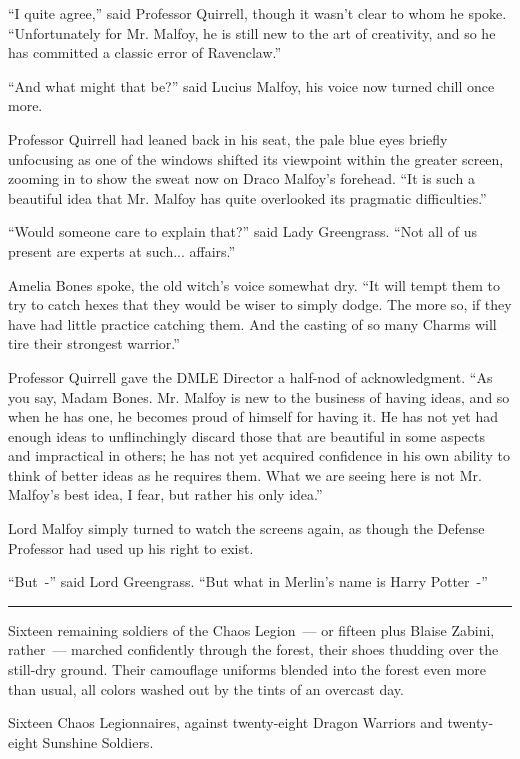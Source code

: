 ``I quite agree,'' said Professor Quirrell, though it wasn't clear to whom he spoke. ``Unfortunately for Mr. Malfoy, he is still new to the art of creativity, and so he has committed a classic error of Ravenclaw.''

``And what might that be?'' said Lucius Malfoy, his voice now turned chill once more.

Professor Quirrell had leaned back in his seat, the pale blue eyes briefly unfocusing as one of the windows shifted its viewpoint within the greater screen, zooming in to show the sweat now on Draco Malfoy's forehead. ``It is such a beautiful idea that Mr. Malfoy has quite overlooked its pragmatic difficulties.''

``Would someone care to explain that?'' said Lady Greengrass. ``Not all of us present are experts at such... affairs.''

Amelia Bones spoke, the old witch's voice somewhat dry. ``It will tempt them to try to catch hexes that they would be wiser to simply dodge. The more so, if they have had little practice catching them. And the casting of so many Charms will tire their strongest warrior.''

Professor Quirrell gave the DMLE Director a half-nod of acknowledgment. ``As you say, Madam Bones. Mr. Malfoy is new to the business of having ideas, and so when he has one, he becomes proud of himself for having it. He has not yet had enough ideas to unflinchingly discard those that are beautiful in some aspects and impractical in others; he has not yet acquired confidence in his own ability to think of better ideas as he requires them. What we are seeing here is not Mr. Malfoy's best idea, I fear, but rather his only idea.''

Lord Malfoy simply turned to watch the screens again, as though the Defense Professor had used up his right to exist.

``But~-'' said Lord Greengrass. ``But what in Merlin's name is Harry Potter~-''

\begin{center}\rule{3in}{0.4pt}\end{center}

Sixteen remaining soldiers of the Chaos Legion~--- or fifteen plus Blaise Zabini, rather~--- marched confidently through the forest, their shoes thudding over the still-dry ground. Their camouflage uniforms blended into the forest even more than usual, all colors washed out by the tints of an overcast day.

Sixteen Chaos Legionnaires, against twenty-eight Dragon Warriors and twenty-eight Sunshine Soldiers.

